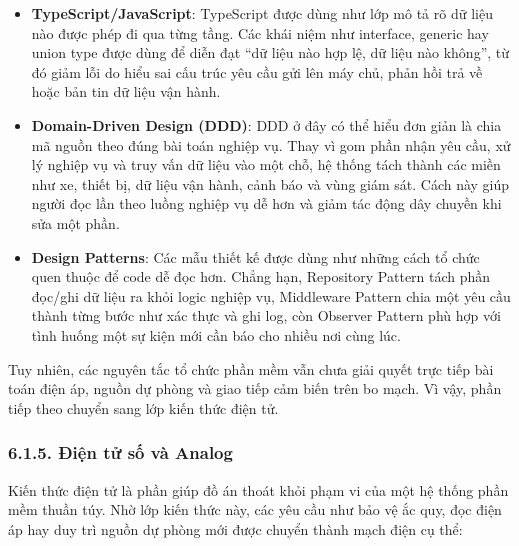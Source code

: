 \documentclass[a4paper]{extarticle}
\providecommand{\tightlist}{%
  \setlength{\itemsep}{0pt}\setlength{\parskip}{0pt}}
\begin{document}
\begin{itemize}
\tightlist
\item
  \textbf{TypeScript/JavaScript}: TypeScript được dùng như lớp mô tả rõ
  dữ liệu nào được phép đi qua từng tầng. Các khái niệm như interface,
  generic hay union type được dùng để diễn đạt ``dữ liệu nào hợp lệ,
  dữ liệu nào không'', từ đó giảm lỗi do hiểu sai cấu trúc yêu cầu gửi
  lên máy chủ, phản hồi trả về hoặc bản tin dữ liệu vận hành.
\item
  \textbf{Domain-Driven Design (DDD)}: DDD ở đây có thể hiểu đơn giản là
  chia mã nguồn theo đúng bài toán nghiệp vụ. Thay vì gom phần nhận yêu
  cầu, xử lý nghiệp vụ và truy vấn dữ liệu vào một chỗ, hệ thống tách
  thành các miền như xe, thiết bị, dữ liệu vận hành, cảnh báo và vùng
  giám sát. Cách này giúp
  người đọc lần theo luồng nghiệp vụ dễ hơn và giảm tác động dây chuyền
  khi sửa một phần.
\item
  \textbf{Design Patterns}: Các mẫu thiết kế được dùng như những cách tổ
  chức quen thuộc để code dễ đọc hơn. Chẳng hạn, Repository Pattern tách
  phần đọc/ghi dữ liệu ra khỏi logic nghiệp vụ, Middleware Pattern chia
  một yêu cầu thành từng bước như xác thực và ghi log, còn Observer
  Pattern phù hợp với tình huống một sự kiện mới cần báo cho nhiều nơi
  cùng lúc.
\end{itemize}

Tuy nhiên, các nguyên tắc tổ chức phần mềm vẫn chưa giải quyết trực tiếp
bài toán điện áp, nguồn dự phòng và giao tiếp cảm biến trên bo mạch. Vì
vậy, phần tiếp theo chuyển sang lớp kiến thức điện tử.

\subsubsection{6.1.5. Điện tử số và
Analog}\label{615-ux111iux1ec7n-tux1eed-sux1ed1-vuxe0-analog}

Kiến thức điện tử là phần giúp đồ án thoát khỏi phạm vi của một hệ thống
phần mềm thuần túy. Nhờ lớp kiến thức này, các yêu cầu như bảo vệ ắc quy,
đọc điện áp hay duy trì nguồn dự phòng mới được chuyển thành mạch điện
cụ thể:
\end{document}
